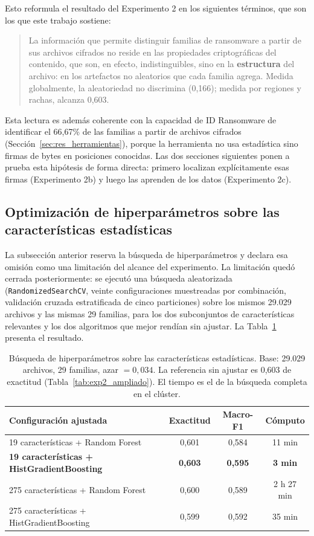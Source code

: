 Esto reformula el resultado del Experimento 2 en los siguientes términos, que son los que este trabajo sostiene:

\begin{quote}
La información que permite distinguir familias de ransomware a partir de sus archivos cifrados no reside en las propiedades criptográficas del contenido, que son, en efecto, indistinguibles, sino en la \textbf{estructura} del archivo: en los artefactos no aleatorios que cada familia agrega. Medida globalmente, la aleatoriedad no discrimina (0,166); medida por regiones y rachas, alcanza 0,603.
\end{quote}

Esta lectura es además coherente con la capacidad de ID Ransomware de identificar el 66,67\% de las familias a partir de archivos cifrados (Sección~\ref{sec:res_herramientas}), porque la herramienta no usa estadística sino firmas de bytes en posiciones conocidas. Las dos secciones siguientes ponen a prueba esta hipótesis de forma directa: primero localizan explícitamente esas firmas (Experimento 2b) y luego las aprenden de los datos (Experimento 2c).

\subsection{Optimización de hiperparámetros sobre las características estadísticas}
\label{subsec:exp2_hiperparametros}

La subsección anterior reserva la búsqueda de hiperparámetros y declara esa omisión como una limitación del alcance del experimento. La limitación quedó cerrada posteriormente: se ejecutó una búsqueda aleatorizada (\texttt{RandomizedSearchCV}, veinte configuraciones muestreadas por combinación, validación cruzada estratificada de cinco particiones) sobre los mismos 29.029 archivos y las mismas 29 familias, para los dos subconjuntos de características relevantes y los dos algoritmos que mejor rendían sin ajustar. La Tabla~\ref{tab:exp2_gridsearch} presenta el resultado.

\begin{table}[ht]
\centering
\caption{Búsqueda de hiperparámetros sobre las características estadísticas. Base: 29.029 archivos, 29 familias, azar $= 0{,}034$. La referencia sin ajustar es 0,603 de exactitud (Tabla~\ref{tab:exp2_ampliado}). El tiempo es el de la búsqueda completa en el clúster.}
\label{tab:exp2_gridsearch}
\begin{tabular}{|l|c|c|c|}
\hline
\textbf{Configuración ajustada} & \textbf{Exactitud} & \textbf{Macro-F1} & \textbf{Cómputo} \\
\hline
19 características + Random Forest & 0,601 & 0,584 & 11 min \\
\textbf{19 características + HistGradientBoosting} & \textbf{0,603} & \textbf{0,595} & \textbf{3 min} \\
275 características + Random Forest & 0,600 & 0,589 & 2 h 27 min \\
275 características + HistGradientBoosting & 0,599 & 0,592 & 35 min \\
\hline
\end{tabular}
\end{table}

